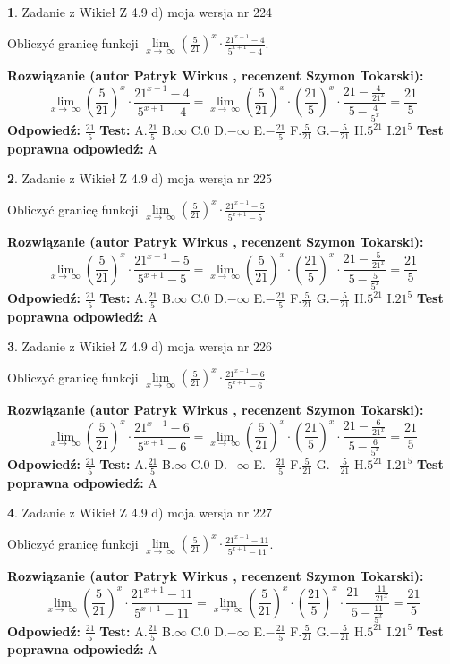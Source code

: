 \documentclass[12pt, a4paper]{article}
\theoremstyle{definition} %
\newtheorem{zad}{}
\newcommand{\zadStart}[1]{\begin{zad}#1\newline}
\newcommand{\zadStop}{\end{zad}}
\newcommand{\rozwStart}[2]{\noindent \textbf{Rozwiązanie (autor #1 , recenzent #2): }\newline}
\newcommand{\rozwStop}{\newline}
\newcommand{\odpStart}{\noindent \textbf{Odpowiedź:}\newline}
\newcommand{\odpStop}{\newline}
\newcommand{\testStart}{\noindent \textbf{Test:}\newline}
\newcommand{\testStop}{\newline}
\newcommand{\kluczStart}{\noindent \textbf{Test poprawna odpowiedź:}\newline}
\newcommand{\kluczStop}{\newline}
\begin{document}
\zadStart{Zadanie z Wikieł Z 4.9 d) moja wersja nr 224}


Obliczyć granicę funkcji  $\lim\limits_{x\to\ \infty}(\frac{5}{21})^{x}\cdot\frac{21^{x+1}-4}{5^{x+1}-4}$.
\zadStop
\rozwStart{Patryk Wirkus}{Szymon Tokarski}
$$\lim\limits_{x\to\ \infty}(\frac{5}{21})^{x}\cdot\frac{21^{x+1}-4}{5^{x+1}-4}=\lim\limits_{x\to\ \infty}(\frac{5}{21})^{x}\cdot(\frac{21}{5})^{x} \cdot \frac{21-\frac{4}{21^{x}}}{5-\frac{4}{5^{x}}} = \frac{21}{5}$$
\rozwStop
\odpStart
$\frac{21}{5}$
\odpStop
\testStart
A.$\frac{21}{5}$ B.$\infty$ C.$0$ D.$-\infty$ E.$-\frac{21}{5}$
F.$\frac{5}{21}$ G.$-\frac{5}{21}$
H.$5^{21}$
I.$21^{5}$
\testStop
\kluczStart
A
\kluczStop



\zadStart{Zadanie z Wikieł Z 4.9 d) moja wersja nr 225}


Obliczyć granicę funkcji  $\lim\limits_{x\to\ \infty}(\frac{5}{21})^{x}\cdot\frac{21^{x+1}-5}{5^{x+1}-5}$.
\zadStop
\rozwStart{Patryk Wirkus}{Szymon Tokarski}
$$\lim\limits_{x\to\ \infty}(\frac{5}{21})^{x}\cdot\frac{21^{x+1}-5}{5^{x+1}-5}=\lim\limits_{x\to\ \infty}(\frac{5}{21})^{x}\cdot(\frac{21}{5})^{x} \cdot \frac{21-\frac{5}{21^{x}}}{5-\frac{5}{5^{x}}} = \frac{21}{5}$$
\rozwStop
\odpStart
$\frac{21}{5}$
\odpStop
\testStart
A.$\frac{21}{5}$ B.$\infty$ C.$0$ D.$-\infty$ E.$-\frac{21}{5}$
F.$\frac{5}{21}$ G.$-\frac{5}{21}$
H.$5^{21}$
I.$21^{5}$
\testStop
\kluczStart
A
\kluczStop



\zadStart{Zadanie z Wikieł Z 4.9 d) moja wersja nr 226}


Obliczyć granicę funkcji  $\lim\limits_{x\to\ \infty}(\frac{5}{21})^{x}\cdot\frac{21^{x+1}-6}{5^{x+1}-6}$.
\zadStop
\rozwStart{Patryk Wirkus}{Szymon Tokarski}
$$\lim\limits_{x\to\ \infty}(\frac{5}{21})^{x}\cdot\frac{21^{x+1}-6}{5^{x+1}-6}=\lim\limits_{x\to\ \infty}(\frac{5}{21})^{x}\cdot(\frac{21}{5})^{x} \cdot \frac{21-\frac{6}{21^{x}}}{5-\frac{6}{5^{x}}} = \frac{21}{5}$$
\rozwStop
\odpStart
$\frac{21}{5}$
\odpStop
\testStart
A.$\frac{21}{5}$ B.$\infty$ C.$0$ D.$-\infty$ E.$-\frac{21}{5}$
F.$\frac{5}{21}$ G.$-\frac{5}{21}$
H.$5^{21}$
I.$21^{5}$
\testStop
\kluczStart
A
\kluczStop



\zadStart{Zadanie z Wikieł Z 4.9 d) moja wersja nr 227}


Obliczyć granicę funkcji  $\lim\limits_{x\to\ \infty}(\frac{5}{21})^{x}\cdot\frac{21^{x+1}-11}{5^{x+1}-11}$.
\zadStop
\rozwStart{Patryk Wirkus}{Szymon Tokarski}
$$\lim\limits_{x\to\ \infty}(\frac{5}{21})^{x}\cdot\frac{21^{x+1}-11}{5^{x+1}-11}=\lim\limits_{x\to\ \infty}(\frac{5}{21})^{x}\cdot(\frac{21}{5})^{x} \cdot \frac{21-\frac{11}{21^{x}}}{5-\frac{11}{5^{x}}} = \frac{21}{5}$$
\rozwStop
\odpStart
$\frac{21}{5}$
\odpStop
\testStart
A.$\frac{21}{5}$ B.$\infty$ C.$0$ D.$-\infty$ E.$-\frac{21}{5}$
F.$\frac{5}{21}$ G.$-\frac{5}{21}$
H.$5^{21}$
I.$21^{5}$
\testStop
\kluczStart
A
\kluczStop
\end{document}
